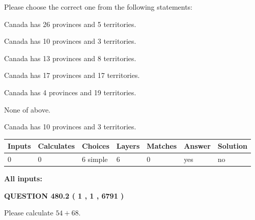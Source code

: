 \documentclass[12pt]{article}
\begin{document}
  
Please choose the correct one from the following statements:
 
 
Canada has  26 provinces and  5 territories.
 
 
Canada has 10  provinces and 3 territories.
 
 
Canada has  13 provinces and  8 territories.
 
 
Canada has  17 provinces and  17 territories.
 
 
Canada has   4 provinces and  19 territories.
 
 
 None of above.
 
 
\noindent{}
 
 
Canada has 10  provinces and 3 territories.
 
 
\noindent{}
 
 
   
   
   
   
\noindent\begin{tabular}{|l|l|l|l|l|l|l|}
 \hline
Inputs & Calculates & Choices & Layers & Matches & Answer & Solution \\ \hline
 0  & 
 0  & 
 6
  simple  
  & 
 6  & 
 0  & 
  yes & 
  no 
  \\ \hline
 \end{tabular}
   
   
   
   
\noindent{}
   
   
   
   
\noindent\vspace{0.1in}\hspace{-0.08in} {\textbf{\Large{All inputs: }}}
   
   
  
\vspace{0.2in}
  
{\textbf{\Large{QUESTION
480.2 
 ( 1 , 1 , 6791 )
}}}
  
  
 
Please calculate $ %
54 +  %
68 $.
 
 
 
\end{document}
